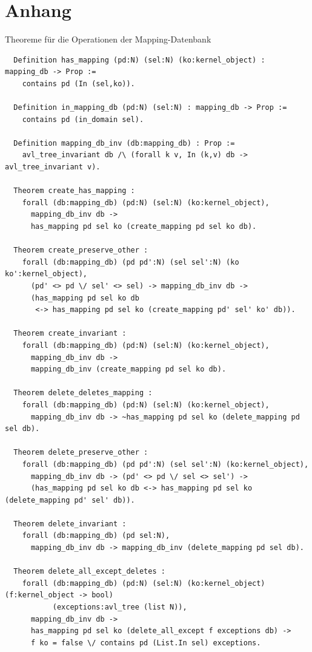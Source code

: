 \documentclass[a4paper, parskip]{scrartcl}
\newenvironment{code}{\captionsetup{type=listing}}{}
\begin{document}
\section{Anhang}
\mbox{}
\begin{code}
  \caption{Theoreme für die Operationen der Mapping-Datenbank}
  \label{lst:db-theorems}

  \begin{verbatim}
  Definition has_mapping (pd:N) (sel:N) (ko:kernel_object) : mapping_db -> Prop :=
    contains pd (In (sel,ko)).

  Definition in_mapping_db (pd:N) (sel:N) : mapping_db -> Prop :=
    contains pd (in_domain sel).

  Definition mapping_db_inv (db:mapping_db) : Prop :=
    avl_tree_invariant db /\ (forall k v, In (k,v) db -> avl_tree_invariant v).

  Theorem create_has_mapping :
    forall (db:mapping_db) (pd:N) (sel:N) (ko:kernel_object),
      mapping_db_inv db ->
      has_mapping pd sel ko (create_mapping pd sel ko db).

  Theorem create_preserve_other :
    forall (db:mapping_db) (pd pd':N) (sel sel':N) (ko ko':kernel_object),
      (pd' <> pd \/ sel' <> sel) -> mapping_db_inv db ->
      (has_mapping pd sel ko db
       <-> has_mapping pd sel ko (create_mapping pd' sel' ko' db)).

  Theorem create_invariant :
    forall (db:mapping_db) (pd:N) (sel:N) (ko:kernel_object),
      mapping_db_inv db ->
      mapping_db_inv (create_mapping pd sel ko db).

  Theorem delete_deletes_mapping :
    forall (db:mapping_db) (pd:N) (sel:N) (ko:kernel_object),
      mapping_db_inv db -> ~has_mapping pd sel ko (delete_mapping pd sel db).
  
  Theorem delete_preserve_other :
    forall (db:mapping_db) (pd pd':N) (sel sel':N) (ko:kernel_object),
      mapping_db_inv db -> (pd' <> pd \/ sel <> sel') ->
      (has_mapping pd sel ko db <-> has_mapping pd sel ko (delete_mapping pd' sel' db)).

  Theorem delete_invariant :
    forall (db:mapping_db) (pd sel:N),
      mapping_db_inv db -> mapping_db_inv (delete_mapping pd sel db).

  Theorem delete_all_except_deletes :
    forall (db:mapping_db) (pd:N) (sel:N) (ko:kernel_object) (f:kernel_object -> bool)
           (exceptions:avl_tree (list N)),
      mapping_db_inv db ->
      has_mapping pd sel ko (delete_all_except f exceptions db) ->
      f ko = false \/ contains pd (List.In sel) exceptions.


\end{verbatim}
\end{code}
\end{document}
